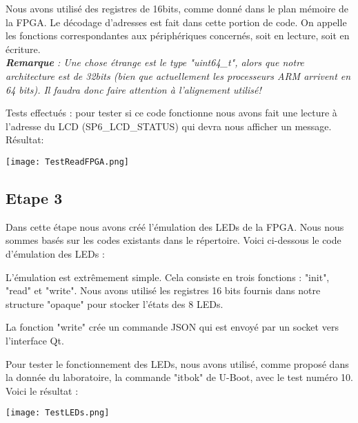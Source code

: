 Nous avons utilisé des registres de 16bits, comme donné dans le plan mémoire de la FPGA.
Le décodage d'adresses est fait dans cette portion de code. On appelle les fonctions correspondantes aux périphériques concernés, soit en lecture, soit en écriture.\\

\textit{\textbf{Remarque} : Une chose étrange est le type "uint64\_t", alors que notre architecture est de 32bits (bien que actuellement les processeurs ARM arrivent en 64 bits). Il faudra donc faire attention à l'alignement utilisé!}

Tests effectués : pour tester si ce code fonctionne nous avons fait une lecture à l'adresse du LCD (SP6\_LCD\_STATUS) qui devra nous afficher un message.
Résultat:
\begin{center} 
\hspace{12.45cm}
\texttt{[image: TestReadFPGA.png]}
\end{center}
\vspace{1cm} 

\pagebreak

\subsection{Etape 3}
Dans cette étape nous avons créé l'émulation des LEDs de la FPGA. Nous nous sommes basés sur les codes existants dans le répertoire. Voici ci-dessous le code d'émulation des LEDs : 


\vspace{0.5cm} 

\vspace{0.5cm} 

L'émulation est extrêmement simple. Cela consiste en trois fonctions : "init", "read" et "write". Nous avons utilisé les registres 16 bits fournis dans notre structure "opaque" pour stocker l'états des 8 LEDs.

La fonction "write" crée un commande JSON qui est envoyé par un socket vers l'interface Qt.

Pour tester le fonctionnement des LEDs, nous avons utilisé, comme proposé dans la donnée du laboratoire, la commande "itbok" de U-Boot, avec le test numéro 10. Voici le résultat :

\begin{center} 
\hspace{12.45cm}
\texttt{[image: TestLEDs.png]}
\end{center}
\vspace{1cm} 

